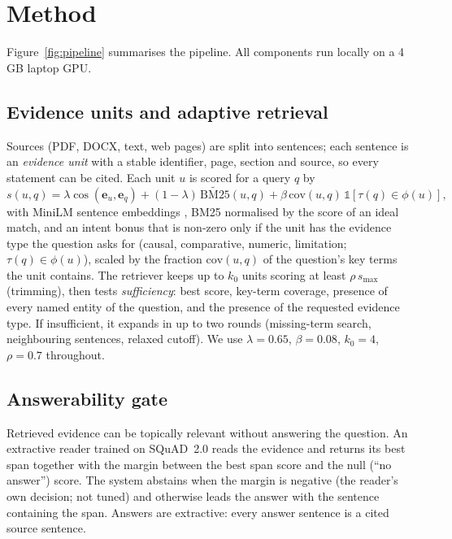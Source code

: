 \section{Method}
\label{sec:method}

Figure~\ref{fig:pipeline} summarises the pipeline. All components run locally on a 4\,GB laptop GPU.

\subsection{Evidence units and adaptive retrieval}
Sources (PDF, DOCX, text, web pages) are split into sentences; each sentence is an \emph{evidence unit} with a stable identifier, page, section and source, so every statement can be cited.
Each unit $u$ is scored for a query $q$ by
\begin{equation}
  s(u,q) = \lambda \cos(\mathbf{e}_u,\mathbf{e}_q) + (1-\lambda)\,\widetilde{\mathrm{BM25}}(u,q) + \beta\,\mathrm{cov}(u,q)\,\mathbb{1}[\tau(q)\in\phi(u)],
\end{equation}
with MiniLM sentence embeddings \citep{reimers2019sbert,wang2020minilm}, BM25 \citep{robertson2009bm25} normalised by the score of an ideal match, and an intent bonus that is non-zero only if the unit has the evidence type the question asks for (causal, comparative, numeric, limitation; $\tau(q)\in\phi(u)$), scaled by the fraction $\mathrm{cov}(u,q)$ of the question's key terms the unit contains.
The retriever keeps up to $k_0$ units scoring at least $\rho\,s_{\max}$ (trimming), then tests \emph{sufficiency}: best score, key-term coverage, presence of every named entity of the question, and the presence of the requested evidence type.
If insufficient, it expands in up to two rounds (missing-term search, neighbouring sentences, relaxed cutoff).
We use $\lambda{=}0.65$, $\beta{=}0.08$, $k_0{=}4$, $\rho{=}0.7$ throughout.

\subsection{Answerability gate}
Retrieved evidence can be topically relevant without answering the question.
An extractive reader trained on SQuAD~2.0 reads the evidence and returns its best span together with the margin between the best span score and the null (``no answer'') score.
The system abstains when the margin is negative (the reader's own decision; not tuned) and otherwise leads the answer with the sentence containing the span.
Answers are extractive: every answer sentence is a cited source sentence.

